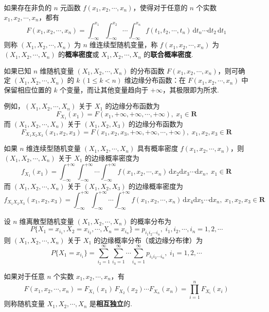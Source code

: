 \begin{definition}
    如果存在非负的 $n$ 元函数 $f(x_1,x_2,\cdots,x_n)$，使得对于任意的 $n$ 个实数 $x_1,x_2,\cdots,x_n$，都有
    $$
    F(x_1,x_2,\cdots,x_n) = \int_{-\infty}^{x_1} \int_{-\infty}^{x_2} \cdots \int_{-\infty}^{x_n} f(t_1,t_2,\cdots,t_n) \, \text{d}t_n \cdots \text{d}t_2 \, \text{d}t_1
    $$
    则称 $(X_1,X_2,\cdots,X_n)$ 为 $n$ 维连续型随机变量，称 $f(x_1,x_2,\cdots,x_n)$ 为 $(X_1,X_2,\cdots,X_n)$ 的\textbf{概率密度}或 $X_1,X_2,\cdots,X_n$ 的\textbf{联合概率密度}.
\end{definition}

\begin{conclusion}
    如果已知 $n$ 维随机变量 $(X_1,X_2,\cdots,X_n)$ 的分布函数 $F(x_1,x_2,\cdots,x_n)$，则可确定 $(X_1,X_2,\cdots,X_n)$ 的 $k \, (1 \leqslant k < n)$ 维边缘分布函数：在 $F(x_1,x_2,\cdots,x_n)$ 中保留相应位置的 $k$ 个变量，而让其他变量趋向于 $+\infty$，其极限即为所求. 
\end{conclusion}

例如，$(X_1,X_2,\cdots,X_n)$ 关于 $X_1$ 的边缘分布函数为
$$
F_{X_1}(x_1) = F(x_1, +\infty, +\infty, \cdots, +\infty), \; x_1 \in \mathbf{R}
$$
而 $(X_1,X_2,\cdots,X_n)$ 关于 $(X_1,X_2,X_3)$ 的边缘分布函数为
$$
F_{X_1 X_2 X_3}(x_1,x_2,x_3) = F(x_1, x_2, x_3, +\infty, +\infty, \cdots, +\infty), \; x_1,x_2,x_3 \in \mathbf{R}
$$

如果 $n$ 维连续型随机变量 $(X_1,X_2,\cdots,X_n)$ 具有概率密度 $f(x_1,x_2,\cdots,x_n)$，则 \\
$(X_1,X_2,\cdots,X_n)$ 关于 $X_1$ 的边缘概率密度为
$$
f_{X_1}(x_1) = \int_{-\infty}^{+\infty} \int_{-\infty}^{+\infty} \cdots \int_{-\infty}^{+\infty} f(x_1,x_2,\cdots,x_n) \, \text{d}x_2 \text{d}x_3 \cdots \text{d}x_n, \; x_1 \in \mathbf{R}
$$
而 $(X_1,X_2,\cdots,X_n)$ 关于 $(X_1,X_2,X_3)$ 的边缘概率密度为
$$
f_{X_1 X_2 X_3}(x_1,x_2,x_3) = \int_{-\infty}^{+\infty} \int_{-\infty}^{+\infty} \cdots \int_{-\infty}^{+\infty} f(x_1,x_2,\cdots,x_n) \, \text{d}x_4 \text{d}x_5 \cdots \text{d}x_n, \; x_1,x_2,x_3 \in \mathbf{R}
$$

设 $n$ 维离散型随机变量 $(X_1,X_2,\cdots,X_n)$ 的概率分布为
$$
P\{X_1 = x_{i_1}, X_2 = x_{i_2}, \cdots, X_n = x_{i_n}\} = p_{i_1 i_2 \cdots i_n}, \; i_1, i_2, \cdots, i_n = 1,2,\cdots
$$
则 $(X_1,X_2,\cdots,X_n)$ 关于 $X_1$ 的边缘概率分布（或边缘分布律）为
$$
P\{X_1=x_{i_1}\} = \sum_{i_2=1}^{\infty} \sum_{i_3=1}^{\infty} \cdots \sum_{i_n=1}^{\infty} p_{i_1 i_2 \cdots i_n}, \; i_1 = 1,2,\cdots
$$

\begin{definition}
    如果对于任意 $n$ 个实数 $x_1,x_2,\cdots,x_n$，有
    $$
    F(x_1,x_2,\cdots,x_n) = F_{X_1}(x_1) \, F_{X_2}(x_2) \cdots F_{X_n}(x_n) = \prod_{i=1}^n F_{X_i}(x_i)
    $$
    则称随机变量 $X_1,X_2,\cdots,X_n$ 是\textbf{相互独立}的.
\end{definition}

